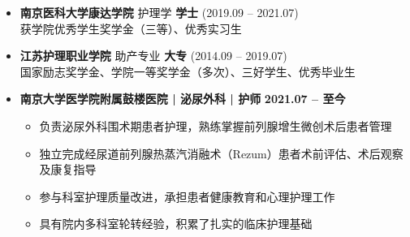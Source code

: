 \documentclass[zh]{resume}
\begin{document}
\makeheader

\begin{itemize}
  \setlength{\itemsep}{2pt} \setlength{\parsep}{0pt} \small
  \item \textbf{南京医科大学康达学院} \hfill 护理学 \hfill \textbf{学士} (2019.09 -- 2021.07) \\
  \small 获学院优秀学生奖学金（三等）、优秀实习生
  \item \textbf{江苏护理职业学院} \hfill 助产专业 \hfill \textbf{大专} (2014.09 -- 2019.07) \\
  \small 国家励志奖学金、学院一等奖学金（多次）、三好学生、优秀毕业生
\end{itemize}

\begin{itemize}
    \small
    \item \textbf{南京大学医学院附属鼓楼医院 | 泌尿外科 | 护师} \hfill \textbf{2021.07 -- 至今}
    \begin{itemize}
        \item 负责泌尿外科围术期患者护理，熟练掌握前列腺增生微创术后患者管理
        \item 独立完成经尿道前列腺热蒸汽消融术（Rezum）患者术前评估、术后观察及康复指导
        \item 参与科室护理质量改进，承担患者健康教育和心理护理工作
        \item 具有院内多科室轮转经验，积累了扎实的临床护理基础
    \end{itemize}
\end{itemize}

\end{document}

